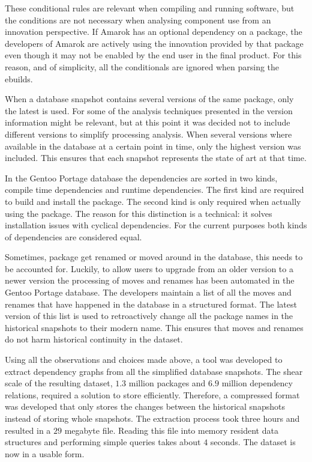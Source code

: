 \documentclass[smallextended,final]{svjour3}
\begin{document}
These conditional rules are relevant when compiling and running software, but the conditions are not necessary when analysing component use from an innovation perspective. If Amarok has an optional dependency on a package, the developers of Amarok are actively using the innovation provided by that package even though it may not be enabled by the end user in the final product. For this reason, and of simplicity, all the conditionals are ignored when parsing the ebuilds.

When a database snapshot contains several versions of the same package, only the latest is used. For some of the analysis techniques presented in the version information might be relevant, but at this point it was decided not to include different versions to simplify processing analysis. When several versions where available in the database at a certain point in time, only the highest version was included. This ensures that each snapshot represents the state of art at that time.

In the Gentoo Portage database the dependencies are sorted in two kinds, compile time dependencies and runtime dependencies. The first kind are required to build and install the package. The second kind is only required when actually using the package. The reason for this distinction is a technical: it solves installation issues with cyclical dependencies. For the current purposes both kinds of dependencies are considered equal.

Sometimes, package get renamed or moved around in the database, this needs to be accounted for. Luckily, to allow users to upgrade from an older version to a newer version the processing of moves and renames has been automated in the Gentoo Portage database. The developers maintain a list of all the moves and renames that have happened in the database in a structured format. The latest version of this list is used to retroactively change all the package names in the historical snapshots to their modern name. This ensures that moves and renames do not harm historical continuity in the dataset.

Using all the observations and choices made above, a tool was developed to extract dependency graphs from all the simplified database snapshots. The shear scale of the resulting dataset, $1.3$ million packages and $6.9$ million dependency relations, required a solution to store efficiently. Therefore, a compressed format was developed that only stores the changes between the historical snapshots instead of storing whole snapshots. The extraction process took three hours and resulted in a $29$ megabyte file. Reading this file into memory resident data structures and performing simple queries takes about $4$ seconds. The dataset is now in a usable form.
\end{document}
